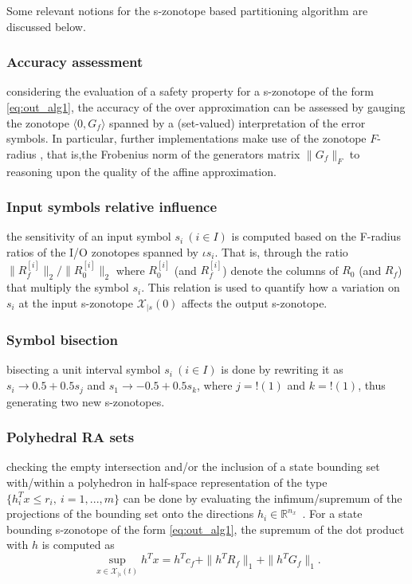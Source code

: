 \documentclass[journal]{IEEEtran}
\begin{document}
Some relevant notions for the s-zonotope based partitioning algorithm are discussed below.

\subsubsection{Accuracy assessment} considering the evaluation of a safety property for a s-zonotope of the form \eqref{eq:out_alg1}, the accuracy of the over approximation can be assessed by gauging the  zonotope  $\langle 0, G_f\rangle$ spanned by a (set-valued) interpretation of the error symbols. In particular, further implementations make use of the zonotope $F$-radius \cite{combastel2015zonotopes}, that is,the Frobenius norm of the generators matrix $\|G_f\|_F$ to reasoning upon the quality of the affine approximation.

\subsubsection{Input symbols relative influence} the sensitivity of an input symbol $s_i\  (i\in I)$ is computed based on the F-radius ratios of the I/O zonotopes spanned by  $\iota s_i$. That is,  through the ratio ${\|R^{[i]}_f\|_2}/{\|R^{[i]}_0\|_2}$ where $R^{[i]}_0$ (and $R^{[i]}_f$) denote the columns of $R_0$ (and $R_f$) that multiply the symbol $s_i$. This relation is used to quantify how a variation on $s_i$ at the input s-zonotope $\mathcal{X}_{|s}(0)$ affects the output s-zonotope.

\subsubsection{Symbol bisection} bisecting a unit interval symbol $s_i\  (i\in I)$ is done by rewriting it as $s_i \to 0.5 + 0.5s_j$ and $s_1 \to -0.5 + 0.5s_k$, where $j = !(1)$ and $k = !(1)$, thus generating two new s-zonotopes.

\subsubsection{Polyhedral RA sets} checking the empty intersection and/or the inclusion of a state bounding set with/within a polyhedron in half-space representation of the type $\{h_i^Tx\leq r_i, \ i= 1,...,m\}$ can be done by evaluating the infimum/supremum of the projections of the bounding set onto the directions  $h_i \in \mathbb{R}^{n_x}$~\cite{kolmanovsky1998theory}. For  a state bounding s-zonotope of the form \eqref{eq:out_alg1}, the supremum of the dot product with $h$ is computed as
\begin{equation}\label{eq:sup_funct}
    \sup_{x \in \mathcal{X}_{|\iota}(t)} h^T x=  h^Tc_f + \|h^TR_f\|_1 +  \|h^TG_f\|_1 .
\end{equation}
\end{document}
